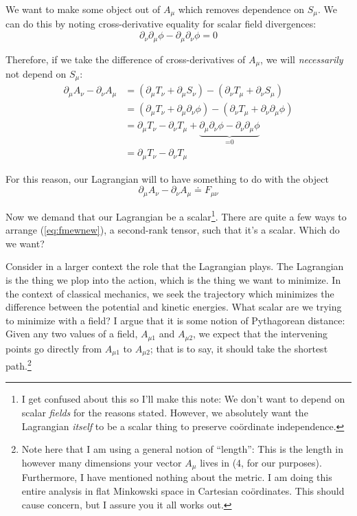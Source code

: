 \documentclass[11pt]{article}
\begin{document}
We want to make some object out of $A_\mu$ which removes dependence on $S_\mu$.  We can do this by noting cross-derivative equality for scalar field divergences:
\begin{equation}
\partial_\nu \partial_\mu \phi - \partial_\mu \partial_\nu \phi = 0
\end{equation}

Therefore, if we take the difference of cross-derivatives of $A_\mu$, we will \emph{necessarily} not depend on $S_\mu$:
\begin{align*}
\partial_\mu A_\nu - \partial_\nu A_\mu &= \left(\partial_\mu T_\nu + \partial_\mu S_\nu\right) - \left(\partial_\nu T_\mu + \partial_\nu S_\mu\right)\\
&= \left(\partial_\mu T_\nu + \partial_\mu \partial_\nu \phi\right) - \left(\partial_\nu T_\mu + \partial_\nu \partial_\mu \phi\right)\\
&= \partial_\mu T_\nu - \partial_\nu T_\mu + \underbrace{\partial_\mu \partial_\nu \phi - \partial_\nu \partial_\mu \phi}_\text{=0}\\
&= \partial_\mu T_\nu - \partial_\nu T_\mu
\end{align*}



For this reason, our Lagrangian will to have something to do with the object
\begin{equation}\label{eq:fmewnew}
\partial_\mu A_\nu - \partial_\nu A_\mu\doteq F_{\mu\nu}
\end{equation}

Now we demand that our Lagrangian be a scalar\footnote{I get confused about this so I'll make this note:  We don't want to depend on scalar \emph{fields} for the reasons stated.  However, we absolutely want the Lagrangian \emph{itself} to be a scalar thing to preserve co\"{o}rdinate independence.}.  There are quite a few ways to arrange (\ref{eq:fmewnew}), a second-rank tensor, such that it's a scalar.  Which do we want?

Consider in a larger context the role that the Lagrangian plays.  The Lagrangian is the thing we plop into the action, which is the thing we want to minimize.  In the context of classical mechanics, we seek the trajectory which minimizes the difference between the potential and kinetic energies.  What scalar are we trying to minimize with a field?  I argue that it is some notion of Pythagorean distance:  Given any two values of a field, $A_{\mu1}$ and $A_{\mu2}$, we expect that the intervening points go directly from $A_{\mu1}$ to $A_{\mu2}$; that is to say, it should take the shortest path.\footnote{Note here that I am using a general notion of ``length'': This is the length in however many dimensions your vector $A_\mu$ lives in (4, for our purposes).  Furthermore, I have mentioned nothing about the metric.  I am doing this entire analysis in flat Minkowski space in Cartesian co\"{o}rdinates.  This should cause concern, but I assure you it all works out.}
\end{document}
